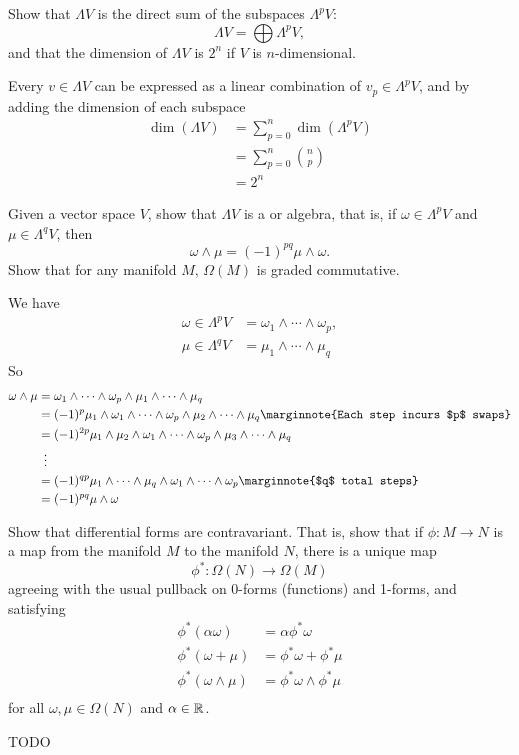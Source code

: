 \documentclass[10pt]{article}
\begin{document}
\begin{example}
	Show that $\Lambda V$ is the direct sum of the subspaces $\Lambda^p V$:
	$$
		\Lambda V = \bigoplus \Lambda^p V,
	$$
	and that the dimension of $\Lambda V$ is $2^n$ if $V$ is $n$-dimensional.
\end{example}
\sol Every $v \in \Lambda V$ can be expressed as a linear combination of $v_p \in \Lambda^p V$, and by adding the dimension of each subspace
$$
\begin{aligned}
	\dim(\Lambda V) &= \sum_{p=0}^{n} \dim(\Lambda^p V)\\
	&= \sum_{p=0}^{n} {n \choose p}\\
	&= 2^n
\end{aligned}
$$


\begin{example}\label{b1e46}
	Given a vector space $V$, show that $\Lambda V$ is a  or  algebra, that is, if $\omega \in \Lambda^p V$ and $\mu \in \Lambda^q V$, then
	$$
		\omega \wedge \mu = (-1)^{pq} \mu \wedge \omega.
	$$
	Show that for any manifold $M$, $\Omega(M)$ is graded commutative.
\end{example}
\sol We have
$$
\begin{aligned}
	\omega \in \Lambda^p V &= \omega_1 \wedge \cdots \wedge \omega_p,\\
	\mu \in \Lambda^q V &= \mu_1 \wedge \cdots \wedge \mu_q
\end{aligned}
$$
So
$$
\begin{aligned}
	\omega \wedge \mu &= \omega_1 \wedge \cdots \wedge \omega_p \wedge \mu_1 \wedge \cdots \wedge \mu_q\\
	&= (-1)^p \mu_1 \wedge \omega_1 \wedge \cdots \wedge \omega_p \wedge \mu_2 \wedge \cdots \wedge \mu_q\marginnote{Each step incurs $p$ swaps}\\
	&= (-1)^{2p} \mu_1 \wedge \mu_2 \wedge \omega_1 \wedge \cdots \wedge \omega_p \wedge \mu_3 \wedge \cdots \wedge \mu_q\\
	&\:\;\vdots\\
	&= (-1)^{qp} \mu_1 \wedge \cdots \wedge \mu_q \wedge \omega_1 \wedge \cdots \wedge \omega_p\marginnote{$q$ total steps}\\
	&= (-1)^{pq} \mu \wedge \omega\\
\end{aligned}
$$


\begin{example}
	Show that differential forms are contravariant. That is, show that if $\phi:M\to N$ is a map from the manifold $M$ to the manifold $N$, there is a unique  map
	$$
		\phi^*:\Omega(N)\to\Omega(M)
	$$
	agreeing with the usual pullback on 0-forms (functions) and 1-forms, and satisfying
	$$
		\begin{aligned}
			\phi^*(\alpha\omega) &= \alpha\phi^*\omega\\
			\phi^*(\omega+\mu) &= \phi^*\omega + \phi^*\mu\\
			\phi^*(\omega\wedge\mu) &= \phi^*\omega \wedge \phi^*\mu\\
		\end{aligned}
	$$
	for all $\omega,\mu \in \Omega(N)$ and $\alpha \in \mathbb{R}$.
\end{example}
\sol TODO
\end{document}
